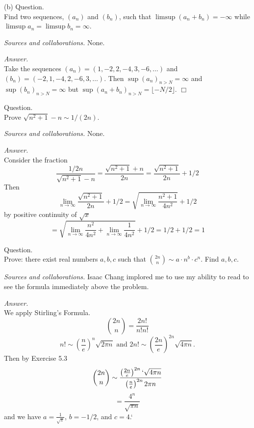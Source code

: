 \documentclass{amsart}
\begin{document}
(b) Question.\\
Find two sequences, $(a_n)$ and $(b_n)$, such that $\limsup(a_n+b_n)=-\infty$ while $\limsup a_n=\limsup b_n=\infty$.

\medskip\noindent
\emph{Sources and collaborations.} 
None.

\medskip\noindent
\emph{Answer.} \\
Take the sequences $(a_n) = (1, -2, 2, -4, 3, -6,\dots)$ and \\
$(b_n) = (-2, 1, -4, 2, -6, 3, \dots)$. Then $\sup (a_n)_{n>N} = \infty$ and $\sup (b_n)_{n>N}=\infty$ but $\sup(a_n+b_n)_{n>N}=\lfloor -N/2 \rfloor$. 
\hfill $\Box$

\medskip\noindent

\newpage
{}

\medskip{} Question.\\
Prove $\sqrt{n^2+1}-n \sim 1/(2n)$.

\medskip\noindent
\emph{Sources and collaborations.}
None.

\medskip\noindent
\emph{Answer.} \\
Consider the fraction \[\frac{1/2n}{\sqrt{n^2+1}-n}=\frac{\sqrt{n^2+1}+n}{2n}= \frac{\sqrt{n^2+1}}{2n}+1/2\]
Then \[\lim_{n\to\infty} \frac{\sqrt{n^2+1}}{2n}+1/2 = \sqrt{\lim_{n\to\infty}\frac{n^2+1}{4n^2}}+1/2\]
by positive continuity of $\sqrt{x}$
\[=\sqrt{\lim_{n\to\infty}\frac{n^2}{4n^2}+\lim_{n\to\infty}\frac{1}{4n^2}}+1/2=1/2+1/2=1\]

\newpage
{} 

 Question.\\
Prove: there exist real numbers $a, b, c$ such that ${2n\choose n} \sim  a \cdot n^b\cdot c^n$. Find $a, b, c$.

\medskip\noindent
\emph{Sources and collaborations.}
Isaac Chang implored me to use my ability to read to see the formula immediately above the problem.

\medskip\noindent
\emph{Answer.} \\
We apply Stirling's Formula. \[{2n\choose n} = \frac{2n!}{n!n!}\] \[n!\sim \left(\frac{n}{e}\right)^n\sqrt{2\pi n} \text{ and } 2n!\sim \left(\frac{2n}{e}\right)^{2n}\sqrt{4\pi n}.\] Then by Exercise 5.3 \[{2n\choose n} \sim \frac{\left(\frac{2n}{e}\right)^{2n}`\sqrt{4\pi n}}{\left(\frac{n}{e}\right)^{2n}2\pi n}\]
\[=\frac{4^{n}}{\sqrt{\pi n}}\]
and we have $a = \frac{1}{\sqrt{\pi}}$, $b= -1/2$, and $c=4$.`

\newpage
{}
\end{document}
